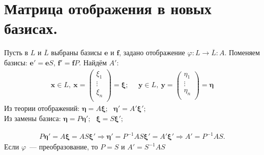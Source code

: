 \section{Матрица отображения в новых базисах.}
Пусть в $L$ и $\overline L$ выбраны базисы $\textbf{e}$ и $\textbf{f}$, задано отображение $\varphi\colon L \to \overline L: A$.
Поменяем базисы: $ \textbf{e}' = \textbf{e} S$, $ \textbf{f}' = \textbf{f} P$.
Найдём $A'$:\\
\begin{gather*}
\textbf{x} \in L,~ \textbf{x}=\left(\begin{smallmatrix}
\xi_1 \\ \vdots\\ \xi_n\\
\end{smallmatrix} \right)=\bm{\xi};~~~~~~
\textbf{y} \in L,~ \textbf{y}=\left(\begin{smallmatrix}
\eta_1 \\ \vdots\\ \eta_n\\
\end{smallmatrix} \right)=\bm{\eta}
\end{gather*}
Из теории отображений: $\bm{\eta} = A \bm{\xi};~~~\bm{\eta}' = A' \bm{\xi}';$\\
Из замены базиса: $	\bm{\eta} = P \bm{\eta}';~~~	\bm{\xi} = S \bm\xi';$

\begin{gather*}
P \bm \eta' = A \bm \xi = AS \bm\xi'
\Rightarrow
\bm\eta' = P^{-1} A S \bm\xi'=A' \bm \xi'
\Rightarrow
\boxed{A' = P^{-1} A S.}
\end{gather*}
Если $\varphi$~--- преобразование, то $P=S$ и $A'=S^{-1}AS$\\

